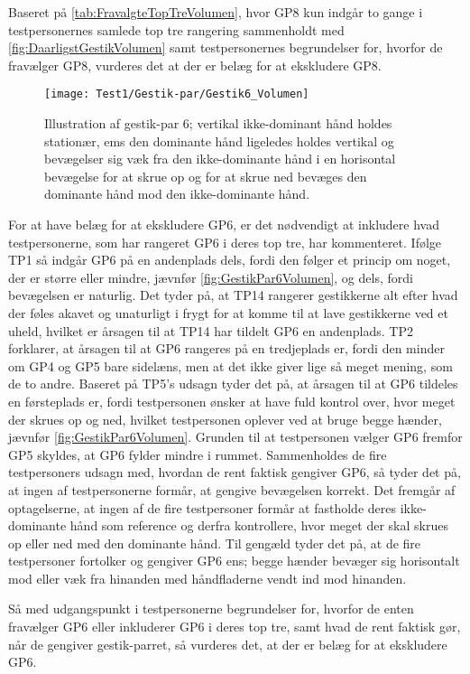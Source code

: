%
Baseret på \autoref{tab:FravalgteTopTreVolumen}, hvor GP8 kun indgår to gange i testpersonernes samlede top tre rangering sammenholdt med \autoref{fig:DaarligstGestikVolumen} samt testpersonernes begrundelser for, hvorfor de fravælger GP8, vurderes det at der er belæg for at ekskludere GP8. 
%
\begin{figure}[H]
	\centering
	\texttt{[image: Test1/Gestik-par/Gestik6\_Volumen]}
	\caption{Illustration af gestik-par 6; vertikal ikke-dominant hånd holdes stationær, ems den dominante hånd ligeledes holdes vertikal og bevægelser sig væk fra den ikke-dominante hånd i en horisontal bevægelse for at skrue op og for at skrue ned bevæges den dominante hånd mod den ikke-dominante hånd.}
	\label{fig:GestikPar6Volumen}
\end{figure}
\noindent
% 
For at have belæg for at ekskludere GP6, er det nødvendigt at inkludere hvad testpersonerne, som har rangeret GP6 i deres top tre, har kommenteret. Ifølge TP1 så indgår GP6 på en andenplads dels, fordi den følger et princip om noget, der er større eller mindre, jævnfør \autoref{fig:GestikPar6Volumen}, og dels, fordi bevægelsen er naturlig. Det tyder på, at TP14 rangerer gestikkerne alt efter hvad der føles akavet og unaturligt i frygt for at komme til at lave gestikkerne ved et uheld, hvilket er årsagen til at TP14 har tildelt GP6 en andenplads. TP2 forklarer, at årsagen til at GP6 rangeres på en tredjeplads er, fordi den minder om GP4 og GP5 bare sidelæns, men at det ikke giver lige så meget mening, som de to andre. Baseret på TP5's udsagn tyder det på, at årsagen til at GP6 tildeles en førsteplads er, fordi testpersonen ønsker at have fuld kontrol over, hvor meget der skrues op og ned, hvilket testpersonen oplever ved at bruge begge hænder, jævnfør \autoref{fig:GestikPar6Volumen}. Grunden til at testpersonen vælger GP6 fremfor GP5 skyldes, at GP6 fylder mindre i rummet. Sammenholdes de fire testpersoners udsagn med, hvordan de rent faktisk gengiver GP6, så tyder det på, at ingen af testpersonerne formår, at gengive bevægelsen korrekt. Det fremgår af optagelserne, at ingen af de fire testpersoner formår at fastholde deres ikke-dominante hånd som reference og derfra kontrollere, hvor meget der skal skrues op eller ned med den dominante hånd. Til gengæld tyder det på, at de fire testpersoner fortolker og gengiver GP6 ens; begge hænder bevæger sig horisontalt mod eller væk fra hinanden med håndfladerne vendt ind mod hinanden. 

Så med udgangspunkt i testpersonerne begrundelser for, hvorfor de enten fravælger GP6 eller inkluderer GP6 i deres top tre, samt hvad de rent faktisk gør, når de gengiver gestik-parret, så vurderes det, at der er belæg for at ekskludere GP6.  





